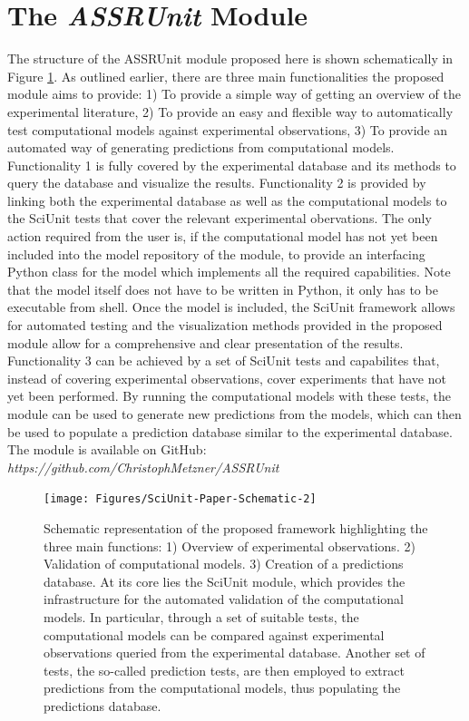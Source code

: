 \documentclass[a4paper,10pt]{article}
\begin{document}
\section{The \textit{ASSRUnit} Module}
The structure of the ASSRUnit module proposed here is shown schematically in Figure \ref{Fig:Scheme}. As outlined earlier, there are three main functionalities the proposed module aims to provide: 1) To provide a simple way of getting an overview
of the experimental literature, 2) To provide an easy and flexible way to automatically test computational models against experimental observations, 3) To provide an automated way of generating predictions from computational
models. Functionality 1 is fully covered by the experimental database and its methods to query the database and visualize the results. Functionality 2 is provided by linking both the experimental database as well as the 
computational models to the SciUnit tests that cover the relevant experimental obervations. The only action required from the user is, if the computational model has not yet been included into the model repository of the module, 
to provide an interfacing Python class for the model which implements all the required capabilities. Note that the model itself does not have to be written in Python, it only has to be executable from shell. Once the model is
included, the SciUnit framework allows for automated testing and the visualization methods provided in the proposed module allow for a comprehensive and clear presentation of the results. Functionality 3 can be achieved by
a set of SciUnit tests and capabilites that, instead of covering experimental observations, cover experiments that have not yet been performed. By running the computational models with these tests, 
the module can be used to generate new predictions from the models, which can then be used to populate a prediction database similar to the experimental database. The module is available on GitHub: 
\textit{https://github.com/ChristophMetzner/ASSRUnit}


\begin{figure}
\texttt{[image: Figures/SciUnit-Paper-Schematic-2]}
\caption{Schematic representation of the proposed framework highlighting the three main functions: 1) Overview of experimental observations. 2) Validation of computational models. 3) Creation of a predictions database. At its core
lies the SciUnit module, which provides the infrastructure for the automated validation of the computational models. In particular, through a set of suitable tests, the computational models can be compared against experimental observations
queried from the experimental database. Another set of tests, the so-called prediction tests, are then employed to extract predictions from the computational models, thus populating the predictions database. }
\label{Fig:Scheme}
\end{figure}
\end{document}
